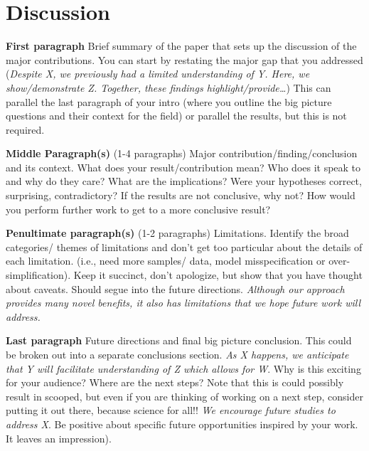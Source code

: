 \section{Discussion}
\discussionTips %

\noindent\textbf{First paragraph} Brief summary of the paper that sets up the discussion of the major contributions. You can start by restating the major gap that you addressed (\textit{Despite X, we previously had a limited understanding of Y. Here, we show/demonstrate Z. Together, these findings highlight/provide\dots}) This can parallel the last paragraph of your intro (where you outline the big picture questions and their context for the field) or parallel the results, but this is not required.

\textbf{Middle Paragraph(s)} (1-4 paragraphs) Major contribution/finding/conclusion and its context. What does your result/contribution mean? Who does it speak to and why do they care? What are the implications? Were your hypotheses correct, surprising, contradictory? If the results are not conclusive, why not? How would you perform further work to get to a more conclusive result?

\textbf{Penultimate paragraph(s)} (1-2 paragraphs) Limitations. Identify the broad categories/ themes of limitations and don’t get too particular about the details of each limitation. (i.e., need more samples/ data, model misspecification or over-simplification). Keep it succinct, don’t apologize, but show that you have thought about caveats. Should segue into the future directions. \textit{Although our approach provides many novel benefits, it also has limitations that we hope future work will address.} 

\textbf{Last paragraph} Future directions and final big picture conclusion. This could be broken out into a separate conclusions section. \textit{As X happens, we anticipate that Y will facilitate understanding of Z which allows for W}. Why is this exciting for your audience? Where are the next steps? Note that this is could possibly result in scooped, but even if you are thinking of working on a next step, consider putting it out there, because science for all!! \textit{We encourage future studies to address X}. Be positive about specific future opportunities inspired by your work. It leaves an impression).
